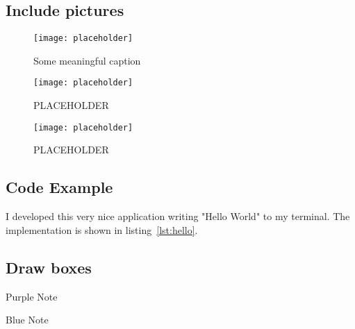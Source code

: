 \subsection{Include pictures}

\begin{figure}[H]
  \centering
  \texttt{[image: placeholder]}
  \caption{Some meaningful caption}
  \label{fig:placeholder:1}
\end{figure}


\begin{figure}[h!]
  \centering
  \begin{minipage}{.4\textwidth}
  	\centering
	\texttt{[image: placeholder]}
	\caption{PLACEHOLDER}
	\label{fig:placeholder:2}
  \end{minipage}
  \hspace{1em}
  \begin{minipage}{.4\textwidth}
	\centering
	\texttt{[image: placeholder]}
	\caption{PLACEHOLDER}
	\label{fig:placeholder:3}
  \end{minipage}%
\end{figure}


\subsection{Code Example}

{
  \thicklines

}
I developed this very nice application writing "Hello World" to my terminal.
The implementation is shown in listing~\ref{lst:hello}.


\subsection{Draw boxes}
\begin{bfhBox}{Purple}
	Note\\
\end{bfhBox}

\blindtext[1]

\begin{bfhBox}{Blue}
	Note\\
\end{bfhBox}

\blindtext[1]


